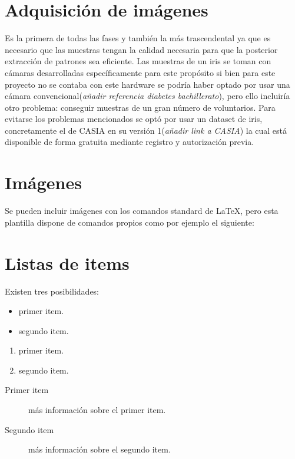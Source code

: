 \section{Adquisición de imágenes}
Es la primera de todas las fases y también la más trascendental ya que es necesario que las muestras tengan la calidad necesaria para que la posterior extracción de patrones sea eficiente.
Las muestras de un iris se toman con cámaras desarrolladas específicamente para este propósito si bien para este proyecto no se contaba con este hardware se podría haber optado por usar una cámara convencional(\emph{añadir referencia diabetes bachillerato}), pero ello incluiría otro problema: conseguir muestras de un gran número de voluntarios.
Para evitarse los problemas mencionados se optó por usar un dataset de iris, concretamente el de CASIA en su versión 1(\emph{añadir link a CASIA}) la cual está disponible de forma gratuita mediante registro y autorización previa.



\section{Imágenes}

Se pueden incluir imágenes con los comandos standard de \LaTeX, pero esta plantilla dispone de comandos propios como por ejemplo el siguiente:




\section{Listas de items}

Existen tres posibilidades:

\begin{itemize}
	\item primer item.
	\item segundo item.
\end{itemize}

\begin{enumerate}
	\item primer item.
	\item segundo item.
\end{enumerate}

\begin{description}
	\item[Primer item] más información sobre el primer item.
	\item[Segundo item] más información sobre el segundo item.
\end{description}
	
